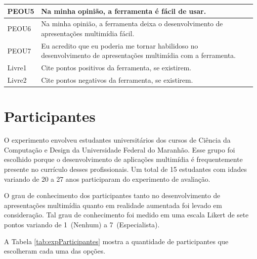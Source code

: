 \documentclass[../main.tex]{subfiles}
\begin{document}
\begin{table}[htpb]
\begin{tabularx}{.95\linewidth}{m{1.3cm} X}
PEOU5 & Na minha opinião, a ferramenta é fácil de usar.
\\\midrule
PEOU6 & Na minha opinião, a ferramenta deixa o desenvolvimento de apresentações multimídia fácil.
\\\midrule
PEOU7 & Eu acredito que eu poderia me tornar habilidoso no desenvolvimento de apresentações multimídia com a ferramenta.
\\\midrule
Livre1 & Cite pontos positivos da ferramenta, se existirem.
\\\midrule
Livre2 & Cite pontos negativos da ferramenta, se existirem.
\\\bottomrule
\end{tabularx}
\end{table}

\section{Participantes}
\label{sec:participantes}

O experimento envolveu estudantes universitários dos cursos de Ciência da Computação e Design da Universidade Federal do Maranhão. Esse grupo foi escolhido porque o desenvolvimento de aplicações multimídia é frequentemente presente no currículo desses profissionais. Um total de 15 estudantes com idades variando de 20 a 27 anos participaram do experimento de avaliação.

O grau de conhecimento dos participantes tanto no desenvolvimento de apresentações multimídia quanto em realidade aumentada foi levado em consideração. Tal grau de conhecimento foi medido em uma escala Likert de sete pontos variando de 1~(Nenhum) a 7~(Especialista).

A Tabela \ref{tab:expParticipantes} mostra a quantidade de participantes que escolheram cada uma das opções.
\end{document}
